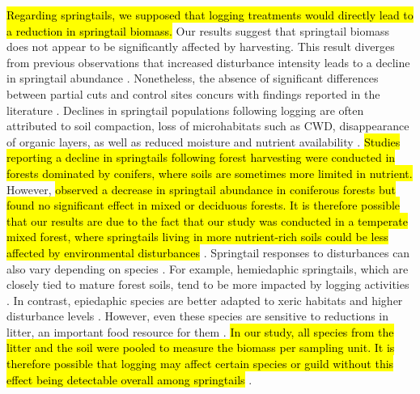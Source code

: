 
\hl{Regarding springtails, we supposed that logging treatments would directly lead to a reduction in springtail biomass. }
Our results suggest that springtail biomass does not appear to be significantly affected by harvesting. 
This result diverges from previous observations that increased disturbance intensity leads to a decline in springtail abundance \citep{Lindo2004Forestfloor,Laigle2021Directindirect,Kudrin2023metaanalysiseffects}. 
Nonetheless, the absence of significant differences between partial cuts and control sites concurs with findings reported in the literature \citep{Kudrin2023metaanalysiseffects}. 
Declines in springtail populations following logging are often attributed to soil compaction, loss of microhabitats such as CWD, 
disappearance of organic layers, as well as reduced moisture and nutrient availability \citep{Bird1986Effectwholetree,Baath1995Microbialcommunity,Lindo2004Forestfloor,rousseauForestFloorMesofauna2018}. 
\hl{Studies reporting a decline in springtails following forest harvesting were conducted in forests dominated by conifers, where soils are sometimes more limited in nutrient. }
However, \cite{Kudrin2023metaanalysiseffects} \hl{observed a decrease in springtail abundance in coniferous forests but found no significant effect in mixed or deciduous forests. 
It is therefore possible that our results are due to the fact that our study was conducted in a temperate mixed forest, where springtails living in more nutrient-rich soils could be less affected by environmental disturbances} \citep{chauvatChangesSoilFaunal2011a}. 
Springtail responses to disturbances can also vary depending on species \citep{raymond-leonardSpringtailCommunityStructure2018a}. 
For example, hemiedaphic springtails, which are closely tied to mature forest soils, tend to be more impacted by logging activities \citep{Laigle2021Directindirect}. 
In contrast, epiedaphic species are better adapted to xeric habitats and higher disturbance levels \citep{Makkonen2011Traitsexplain,rousseauWoodyBiomassRemoval2019}. 
However, even these species are sensitive to reductions in litter, an important food resource for them \citep{rousseauForestFloorMesofauna2018}. 
\hl{In our study, all species from the litter and the soil were pooled to measure the biomass per sampling unit. 
It is therefore possible that logging may affect certain species or guild without this effect being detectable overall among springtails} \cite{Addison1998Responsesoil}. 



